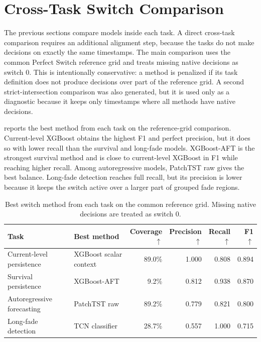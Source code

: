 \section{Cross-Task Switch Comparison}
\label{sec:results-cross-task-switch-comparison}

The previous sections compare models inside each task. A direct cross-task
comparison requires an additional alignment step, because the tasks do not make
decisions on exactly the same timestamps. The main comparison uses the common
Perfect Switch reference grid and treats missing native decisions as switch
\(0\). This is intentionally conservative: a method is penalized if its task
definition does not produce decisions over part of the reference grid. A second
strict-intersection comparison was also generated, but it is used only as a
diagnostic because it keeps only timestamps where all methods have native
decisions.

 reports the best method from each task on
the reference-grid comparison. Current-level XGBoost obtains the highest F1 and
perfect precision, but it does so with lower recall than the survival and
long-fade models. XGBoost-AFT is the strongest survival method and is close to
current-level XGBoost in F1 while reaching higher recall. Among autoregressive
models, PatchTST raw gives the best balance. Long-fade detection reaches full
recall, but its precision is lower because it keeps the switch active over a
larger part of grouped fade regions.

\begin{table}[htbp]
  \centering
  \caption{Best switch method from each task on the common reference grid. Missing native decisions are treated as switch \(0\).}
  \label{tab:cross-task-best-results}
  \small
  \setlength{\tabcolsep}{4pt}
  \renewcommand{\arraystretch}{1.15}
  \begin{tabular}{
    @{}
    >{\raggedright\arraybackslash}p{}
    >{\raggedright\arraybackslash}p{}
    rrrr
    @{}
  }
    \toprule
    Task & Best method
      & \shortstack{Coverage\\\(\uparrow\)}
      & \shortstack{Precision\\\(\uparrow\)}
      & \shortstack{Recall\\\(\uparrow\)}
      & \shortstack{F1\\\(\uparrow\)} \\
    \midrule
    Current-level persistence & XGBoost scalar context & 89.0\% & 1.000 & 0.808 & 0.894 \\
    Survival persistence & XGBoost-AFT & 9.2\% & 0.812 & 0.938 & 0.870 \\
    Autoregressive forecasting & PatchTST raw & 89.2\% & 0.779 & 0.821 & 0.800 \\
    Long-fade detection & TCN classifier & 28.7\% & 0.557 & 1.000 & 0.715 \\
    \bottomrule
  \end{tabular}
\end{table}

